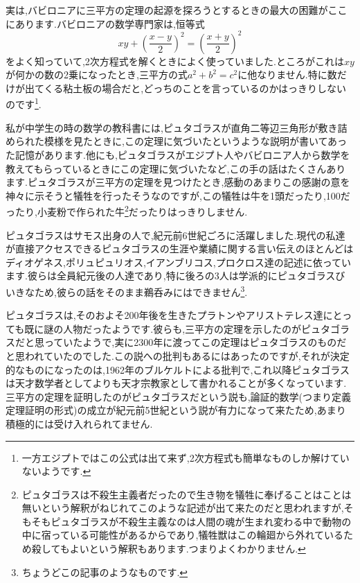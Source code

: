 \documentclass[./main]{subfiles}
\begin{document}
実は,バビロニアに三平方の定理の起源を探ろうとするときの最大の困難がここにあります.バビロニアの数学専門家は,恒等式
\begin{equation}
	xy + \left( \frac{x-y}{2} \right)^2 = \left( \frac{x+y}{2} \right)^2
\end{equation}
をよく知っていて,2次方程式を解くときによく使っていました.ところがこれは$xy$が何かの数の2乗になったとき,三平方の式$a^2 + b^2 = c^2$に他なりません.特に数だけが出てくる粘土板の場合だと,どっちのことを言っているのかはっきりしないのです\footnote{一方エジプトではこの公式は出て来ず,2次方程式も簡単なものしか解けていないようです.}.


私が中学生の時の数学の教科書には,ピュタゴラスが直角二等辺三角形が敷き詰められた模様を見たときに,この定理に気づいたというような説明が書いてあった記憶があります.他にも,ピュタゴラスがエジプト人やバビロニア人から数学を教えてもらっているときにこの定理に気づいたなど,この手の話はたくさんあります.ピュタゴラスが三平方の定理を見つけたとき,感動のあまりこの感謝の意を神々に示そうと犠牲を行ったそうなのですが,この犠牲は牛を1頭だったり,100だったり,小麦粉で作られた牛\footnote{\cite{Por} ピュタゴラスは不殺生主義者だったので生き物を犠牲に奉げることはことは無いという解釈がねじれてこのような記述が出て来たのだと思われますが,そもそもピュタゴラスが不殺生主義なのは人間の魂が生まれ変わる中で動物の中に宿っている可能性があるからであり,犠牲獣はこの輪廻から外れているため殺してもよいという解釈もあります.つまりよくわかりません.}だったりはっきりしません.

ピュタゴラスはサモス出身の人で,紀元前6世紀ごろに活躍しました.現代の私達が直接アクセスできるピュタゴラスの生涯や業績に関する言い伝えのほとんどはディオゲネス,ポリュピュリオス,イアンブリコス,プロクロス達の記述に依っています.彼らは全員紀元後の人達であり,特に後ろの3人は学派的にピュタゴラスびいきなため,彼らの話をそのまま鵜呑みにはできません\footnote{ちょうどこの記事のようなものです.}.

ピュタゴラスは,そのおよそ200年後を生きたプラトンやアリストテレス達にとっても既に謎の人物だったようです.彼らも,三平方の定理を示したのがピュタゴラスだと思っていたようで,実に2300年に渡ってこの定理はピュタゴラスのものだと思われていたのでした.この説への批判もあるにはあったのですが,それが決定的なものになったのは,1962年のブルケルトによる批判で,これ以降ピュタゴラスは天才数学者としてよりも天才宗教家として書かれることが多くなっています.三平方の定理を証明したのがピュタゴラスだという説も,論証的数学(つまり定義定理証明の形式)の成立が紀元前5世紀という説が有力になって来たため,あまり積極的には受け入れられてません.
\end{document}
